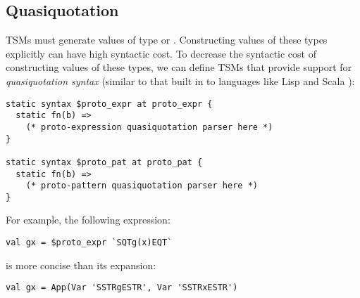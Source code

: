 \subsection{Quasiquotation}
TSMs must generate values of type  or . Constructing values of these types explicitly can have high syntactic cost. To decrease the syntactic cost of constructing values of these types, we can define TSMs that provide support for \emph{quasiquotation syntax} (similar to that built in to languages like Lisp \cite{Bawd99a} and Scala \cite{shabalin2013quasiquotes}):
\begin{lstlisting}[numbers=none]
static syntax $proto_expr at proto_expr {
  static fn(b) => 
    (* proto-expression quasiquotation parser here *)
}

static syntax $proto_pat at proto_pat {
  static fn(b) => 
    (* proto-pattern quasiquotation parser here *)
}
\end{lstlisting}
For example, the following expression:
\begin{lstlisting}[numbers=none]
val gx = $proto_expr `SQTg(x)EQT`
\end{lstlisting}
is more concise than its expansion:
\begin{lstlisting}[numbers=none]
val gx = App(Var 'SSTRgESTR', Var 'SSTRxESTR')
\end{lstlisting}
